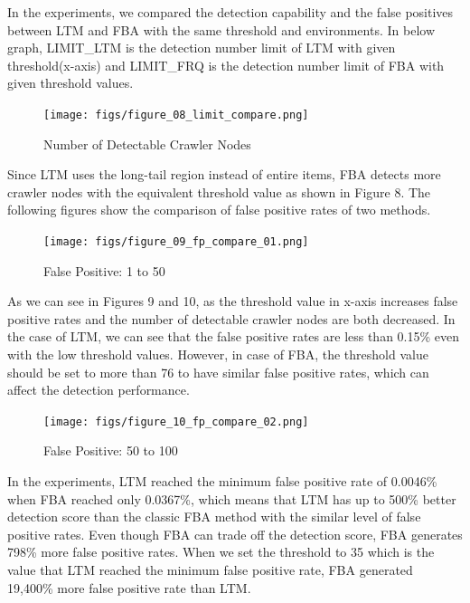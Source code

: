 \documentclass[sigconf,review]{acmart}
\begin{document}
In the experiments, we compared the detection capability and the false positives between LTM and FBA with the same threshold and environments. In below graph, LIMIT\_LTM is the detection number limit of LTM with given threshold(x-axis) and LIMIT\_FRQ is the detection number limit of FBA with given threshold values.

\begin{figure}[H]
    \centering
    \texttt{[image: figs/figure\_08\_limit\_compare.png]}
    \caption{Number of Detectable Crawler Nodes}
    \label{fig:num_of_nodes}
\end{figure}

Since LTM uses the long-tail region instead of entire items, FBA detects more crawler nodes with the equivalent threshold value as shown in Figure 8. The following figures show the comparison of false positive rates of two methods. 

\begin{figure}[H]
    \centering
    \texttt{[image: figs/figure\_09\_fp\_compare\_01.png]}
    \caption{False Positive: 1 to 50}
    \label{fig:fp1to50} 
\end{figure}

As we can see in Figures 9 and 10, as the threshold value in x-axis increases false positive rates and the number of detectable crawler nodes are both decreased. In the case of LTM, we can see that the false positive rates are less than 0.15\% even with the low threshold values. However, in case of FBA, the threshold value should be set to more than 76 to have similar false positive rates, which can affect the detection performance.

\begin{figure}[H]
    \centering
    \texttt{[image: figs/figure\_10\_fp\_compare\_02.png]}
    \caption{False Positive: 50 to 100}
    \label{fig:FP2}
\end{figure}
 

In the experiments, LTM reached the minimum false positive rate of 0.0046\% when FBA reached only 0.0367\%, which means that LTM has up to 500\% better detection score than the classic FBA method with the similar level of false positive rates. Even though FBA can trade off the detection score, FBA generates 798\% more false positive rates. When we set the threshold to 35 which is the value that LTM reached the minimum false positive rate, FBA generated 19,400\% more false positive rate than LTM.
\end{document}
